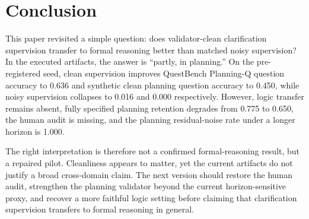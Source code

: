 \section{Conclusion}
This paper revisited a simple question: does validator-clean clarification supervision transfer to formal reasoning better than matched noisy supervision? In the executed artifacts, the answer is ``partly, in planning.'' On the pre-registered seed, clean supervision improves QuestBench Planning-Q question accuracy to 0.636 and synthetic clean planning question accuracy to 0.450, while noisy supervision collapses to 0.016 and 0.000 respectively. However, logic transfer remains absent, fully specified planning retention degrades from 0.775 to 0.650, the human audit is missing, and the planning residual-noise rate under a longer horizon is 1.000.

The right interpretation is therefore not a confirmed formal-reasoning result, but a repaired pilot. Cleanliness appears to matter, yet the current artifacts do not justify a broad cross-domain claim. The next version should restore the human audit, strengthen the planning validator beyond the current horizon-sensitive proxy, and recover a more faithful logic setting before claiming that clarification supervision transfers to formal reasoning in general.





